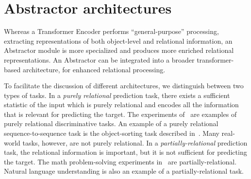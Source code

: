 \section{Abstractor architectures}\label{sec:abstractor_architectures}


Whereas a Transformer Encoder performs ``general-purpose'' processing, extracting representations of both object-level and relational information, an Abstractor module is more specialized and produces more enriched relational representations. An Abstractor can be integrated into a broader transformer-based architecture, for enhanced relational processing.

To facilitate the discussion of different architectures, we distinguish between two types of tasks. In a \textit{purely relational} prediction task, there exists a sufficient statistic of the input which is purely relational and encodes all the information that is relevant for predicting the target. The experiments of~\citep{esbn,kerg2022neural} are examples of purely relational discriminative tasks. An example of a purely relational sequence-to-sequence task is the object-sorting task described in~.
Many real-world tasks, however, are not purely relational. In a \textit{partially-relational} prediction task, the relational information is important, but it is not sufficient for predicting the target. The math problem-solving experiments in~ are partially-relational. Natural language understanding is also an example of a partially-relational task.

